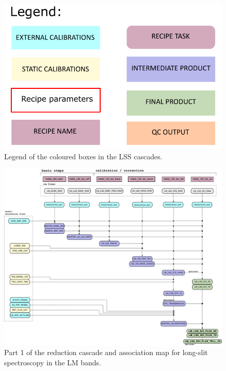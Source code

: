 \begin{figure}[ht]
  \centering
  \includegraphics[width=0.4\textheight]{figures/legend.pdf}
  \caption[Legend]{Legend of the coloured boxes in the \ac{LSS} cascades.}
  \label{Fig:LSScascadelegend}
\end{figure}
\clearpage


\begin{landscape}
\begin{figure}[ht]
  \centering
  \includegraphics{figures/LM_LSS_pipeline_wf_draft_latest_part_1_v0.82.png}
  \caption[Reduction cascade and association map for LM long-slit
  spectroscopy]{Part 1 of the reduction cascade and association map for long-slit
    spectroscopy in the LM bands.}
  \label{Fig:LMLssAssomap1}
\end{figure}
\end{landscape}

